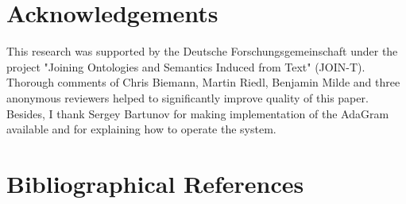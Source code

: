 \documentclass[10pt, a4paper]{article}
\begin{document}
\section{Acknowledgements}

This research was supported by the Deutsche For\-schungs\-gemeinschaft under the project "Joining Ontologies and Semantics Induced from Text" (JOIN-T). Thorough comments of Chris Biemann, Martin Riedl, Benjamin Milde and three anonymous reviewers helped to significantly improve quality of this paper. Besides, I thank Sergey Bartunov for making implementation of the AdaGram available and for explaining how to operate the system. 

\section{Bibliographical References}
\label{main:ref}





\end{document}

